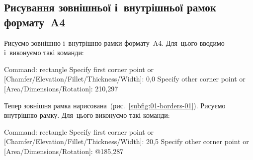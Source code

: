 \documentclass[
	a4paper,
	oneside,
	BCOR = 10mm,
	DIV = 12,
	12pt,
	headings = normal,
]{scrartcl}
\begin{document}
		\subsection{Рисування зовнішньої і~внутрішньої рамок формату~\textenglish{A4}}
			Рисуємо зовнішню і~внутрішню рамки формату~\textenglish{A4}. Для~цього вводимо і~виконуємо такі команди:
			\begin{codegeneric}
				Command: rectangle
				Specify first corner point or [Chamfer/Elevation/Fillet/Thickness/Width]: 0,0
				Specify other corner point or [Area/Dimensions/Rotation]: 210,297
			\end{codegeneric}
			Тепер зовнішня рамка нарисована~(рис.~\ref{subfig:01-borders-01}). Рисуємо внутрішню рамку. Для~цього виконуємо такі команди:
			\begin{codegeneric}
				Command: rectangle
				Specify first corner point or [Chamfer/Elevation/Fillet/Thickness/Width]: 20,5
				Specify other corner point or [Area/Dimensions/Rotation]: @185,287
			\end{codegeneric}
\end{document}
